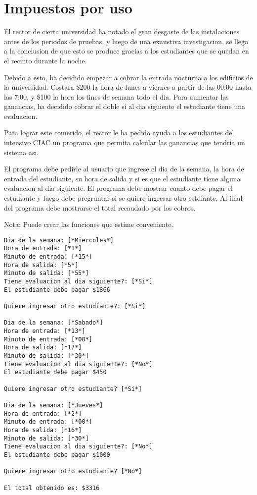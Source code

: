 
\section{Impuestos por uso}

El rector de cierta universidad ha notado el gran desgaste de las instalaciones antes de los periodos de pruebas, y luego de una exaustiva investigacion, se llego a la conclusion de que esto se produce gracias a los estudiantes que se quedan en el recinto durante la noche.

Debido a esto, ha decidido empezar a cobrar la entrada nocturna a los edificios de la universidad. Costara \$200 la hora de lunes a viernes a partir de las 00:00 hasta las 7:00, y \$100 la hora los fines de semana todo el día. Para aumentar las ganancias, ha decidido cobrar el doble si al dia siguiente el estudiante tiene una evaluacion.

Para lograr este cometido, el rector le ha pedido ayuda a los estudiantes del intensivo CIAC un programa que permita calcular las ganancias que tendria un sistema asi.

El programa debe pedirle al usuario que ingrese el dia de la semana, la hora de entrada del estudiante, su hora de salida y si es que el estudiante tiene alguna evaluacion al dia siguiente. El programa debe mostrar cuanto debe pagar el estudiante y luego debe pregruntar si se quiere ingresar otro estdiante. Al final del programa debe mostrarse el total recaudado por los cobros.

Nota: Puede crear las funciones que estime conveniente.

\begin{lstlisting}[style=consola]
Dia de la semana: [*Miercoles*]
Hora de entrada: [*1*]
Minuto de entrada: [*15*]
Hora de salida: [*5*]
Minuto de salida: [*55*]
Tiene evaluacion al dia siguiente?: [*Si*]
El estudiante debe pagar $1866 

Quiere ingresar otro estudiante?: [*Si*]

Dia de la semana: [*Sabado*]
Hora de entrada: [*13*]
Minuto de entrada: [*00*]
Hora de salida: [*17*]
Minuto de salida: [*30*]
Tiene evaluacion al dia siguiente?: [*No*]
El estudiante debe pagar $450

Quiere ingresar otro estudiante? [*Si*]

Dia de la semana: [*Jueves*]
Hora de entrada: [*2*]
Minuto de entrada: [*00*]
Hora de salida: [*16*]
Minuto de salida: [*30*]
Tiene evaluacion al dia siguiente?: [*No*]
El estudiante debe pagar $1000

Quiere ingresar otro estudiante? [*No*]

El total obtenido es: $3316
\end{lstlisting}

\newpage
